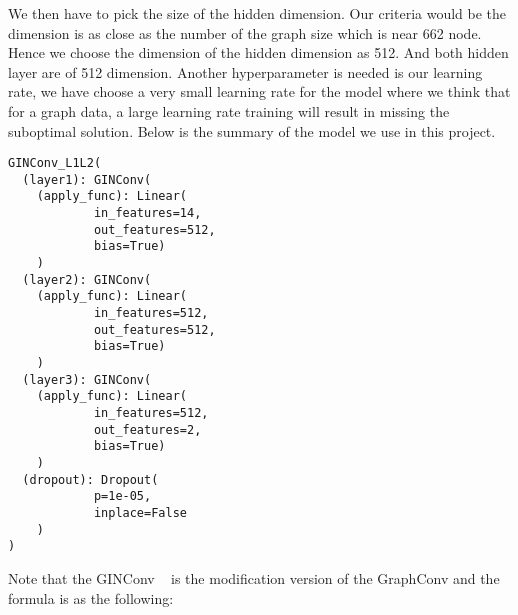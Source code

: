         
        

    

        

We then have to pick the size of the hidden dimension. Our criteria would be the dimension is as close as the number of the graph size which is near 662 node. Hence we choose the dimension of the hidden dimension as 512. And both hidden layer are of 512 dimension. Another hyperparameter is needed is our learning rate, we have choose a very small learning rate for the model where we think that for a graph data, a large learning rate training will result in missing the suboptimal solution. Below is the summary of the model we use in this project.\\

\begin{verbatim}
GINConv_L1L2(
  (layer1): GINConv(
    (apply_func): Linear(
            in_features=14, 
            out_features=512, 
            bias=True)
    )
  (layer2): GINConv(
    (apply_func): Linear(
            in_features=512, 
            out_features=512, 
            bias=True)
    )
  (layer3): GINConv(
    (apply_func): Linear(
            in_features=512, 
            out_features=2, 
            bias=True)
    )
  (dropout): Dropout(
            p=1e-05, 
            inplace=False
    )
)
\end{verbatim}

Note that the GINConv ~\cite{xu2019powerful} is the modification version of the GraphConv and the formula is as the following:

